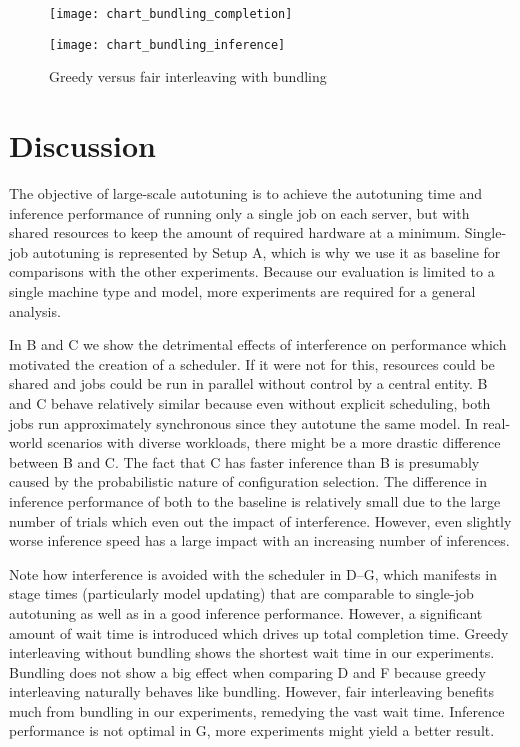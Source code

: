 \begin{figure}[t]
	\begin{minipage}[b]{.6\textwidth}
		\centering\texttt{[image: chart\_bundling\_completion]}
		\label{fig:chart-bundling-completion}
	\end{minipage}%
	\hfill
	\begin{minipage}[b]{.35\textwidth}
		\centering\texttt{[image: chart\_bundling\_inference]}
		\label{fig:chart-bundling-inference}
	\end{minipage}
	\caption[Results of greedy versus fair interleaving with bundling]{Greedy versus fair interleaving with bundling}
	\label{fig:chart-bundling}
\end{figure}

\section{Discussion}
The objective of large-scale autotuning is to achieve the autotuning time and inference performance of running only a single job on each server, but with shared resources to keep the amount of required hardware at a minimum. Single-job autotuning is represented by Setup A, which is why we use it as baseline for comparisons with the other experiments. Because our evaluation is limited to a single machine type and model, more experiments are required for a general analysis.

In B and C we show the detrimental effects of interference on performance which motivated the creation of a scheduler. If it were not for this, resources could be shared and jobs could be run in parallel without control by a central entity. B and C behave relatively similar because even without explicit scheduling, both jobs run approximately synchronous since they autotune the same model. In real-world scenarios with diverse workloads, there might be a more drastic difference between B and C. The fact that C has faster inference than B is presumably caused by the probabilistic nature of configuration selection. The difference in inference performance of both to the baseline is relatively small due to the large number of trials which even out the impact of interference. However, even slightly worse inference speed has a large impact with an increasing number of inferences.

Note how interference is avoided with the scheduler in D--G, which manifests in stage times (particularly model updating) that are comparable to single-job autotuning as well as in a good inference performance. However, a significant amount of wait time is introduced which drives up total completion time. Greedy interleaving without bundling shows the shortest wait time in our experiments. Bundling does not show a big effect when comparing D and F because greedy interleaving naturally behaves like bundling. However, fair interleaving benefits much from bundling in our experiments, remedying the vast wait time. Inference performance is not optimal in G, more experiments might yield a better result.

